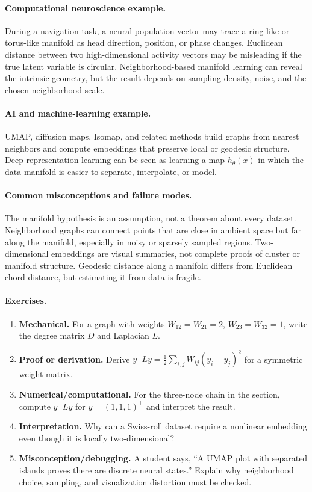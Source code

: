 \paragraph{Computational neuroscience example.}
During a navigation task, a neural population vector may trace a ring-like or torus-like manifold as head direction, position, or phase changes. Euclidean distance between two high-dimensional activity vectors may be misleading if the true latent variable is circular. Neighborhood-based manifold learning can reveal the intrinsic geometry, but the result depends on sampling density, noise, and the chosen neighborhood scale.

\paragraph{AI and machine-learning example.}
UMAP, diffusion maps, Isomap, and related methods build graphs from nearest neighbors and compute embeddings that preserve local or geodesic structure. Deep representation learning can be seen as learning a map \(h_\theta(x)\) in which the data manifold is easier to separate, interpolate, or model.

\paragraph{Common misconceptions and failure modes.}
The manifold hypothesis is an assumption, not a theorem about every dataset. Neighborhood graphs can connect points that are close in ambient space but far along the manifold, especially in noisy or sparsely sampled regions. Two-dimensional embeddings are visual summaries, not complete proofs of cluster or manifold structure. Geodesic distance along a manifold differs from Euclidean chord distance, but estimating it from data is fragile.

\paragraph{Exercises.}
\begin{enumerate}[label=\textbf{35.3.\arabic*.}, leftmargin=*]
\item \textbf{Mechanical.} For a graph with weights \(W_{12}=W_{21}=2\), \(W_{23}=W_{32}=1\), write the degree matrix \(D\) and Laplacian \(L\).
\item \textbf{Proof or derivation.} Derive \(y^\top L y=\frac12\sum_{i,j}W_{ij}(y_i-y_j)^2\) for a symmetric weight matrix.
\item \textbf{Numerical/computational.} For the three-node chain in the section, compute \(y^\top L y\) for \(y=(1,1,1)^\top\) and interpret the result.
\item \textbf{Interpretation.} Why can a Swiss-roll dataset require a nonlinear embedding even though it is locally two-dimensional?
\item \textbf{Misconception/debugging.} A student says, ``A UMAP plot with separated islands proves there are discrete neural states.'' Explain why neighborhood choice, sampling, and visualization distortion must be checked.
\end{enumerate}

